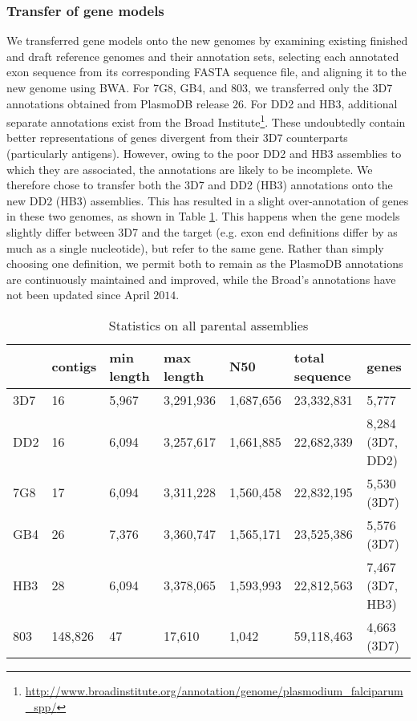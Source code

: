 \subsubsection{Transfer of gene models}

We transferred gene models onto the new genomes by examining existing finished and draft reference genomes and their annotation sets, selecting each annotated exon sequence from its corresponding FASTA sequence file, and aligning it to the new genome using BWA.  For 7G8, GB4, and 803, we transferred only the 3D7 annotations obtained from PlasmoDB release $26$\cite{Aurrecoechea:2009hh}.  For DD2 and HB3, additional separate annotations exist from the Broad Institute\footnote{\url{http://www.broadinstitute.org/annotation/genome/plasmodium_falciparum_spp/}}.  These undoubtedly contain better representations of genes divergent from their 3D7 counterparts (particularly antigens).  However, owing to the poor DD2 and HB3 assemblies to which they are associated, the annotations are likely to be incomplete.  We therefore chose to transfer both the 3D7 and DD2 (HB3) annotations onto the new DD2 (HB3) assemblies.  This has resulted in a slight over-annotation of genes in these two genomes, as shown in Table \ref{tbl:refstats}.  This happens when the gene models slightly differ between 3D7 and the target (e.g. exon end definitions differ by as much as a single nucleotide), but refer to the same gene.  Rather than simply choosing one definition, we permit both to remain as the PlasmoDB annotations are continuously maintained and improved, while the Broad's annotations have not been updated since April $2014$.

\begin{table}[]
\centering
\caption{Statistics on all parental assemblies}
\label{tbl:refstats}
\begin{tabular}{@{}lllllll@{}}
\toprule
    & contigs & min length & max length & N50       & total sequence & genes            \\ \midrule
3D7 & 16      & 5,967      & 3,291,936  & 1,687,656 & 23,332,831     & 5,777            \\
DD2 & 16      & 6,094      & 3,257,617  & 1,661,885 & 22,682,339     & 8,284 (3D7, DD2) \\
7G8 & 17      & 6,094      & 3,311,228  & 1,560,458 & 22,832,195     & 5,530 (3D7)      \\
GB4 & 26      & 7,376      & 3,360,747  & 1,565,171 & 23,525,386     & 5,576 (3D7)      \\
HB3 & 28      & 6,094      & 3,378,065  & 1,593,993 & 22,812,563     & 7,467 (3D7, HB3) \\
803 & 148,826 & 47         & 17,610     & 1,042     & 59,118,463     & 4,663 (3D7)      \\ \bottomrule
\end{tabular}
\end{table}

